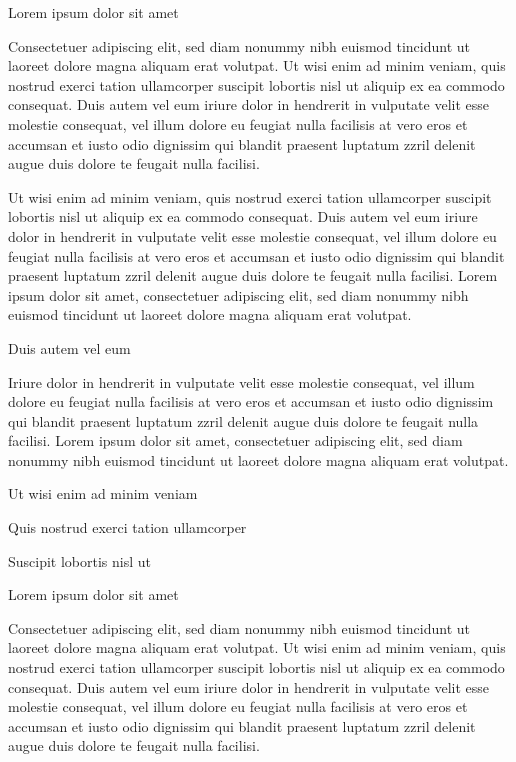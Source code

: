 \documentclass[11pt,twoside]{article}\makeatletter
\begin{document}
Lorem ipsum dolor sit amet\par
Consectetuer adipiscing elit, sed diam nonummy nibh euismod       tincidunt ut laoreet dolore magna aliquam erat volutpat. Ut wisi enim       ad minim veniam, quis nostrud exerci tation ullamcorper suscipit       lobortis nisl ut aliquip ex ea commodo consequat. Duis autem vel eum       iriure dolor in hendrerit in vulputate velit esse molestie consequat,       vel illum dolore eu feugiat nulla facilisis at vero eros et accumsan       et iusto odio dignissim qui blandit praesent luptatum zzril delenit       augue duis dolore te feugait nulla facilisi.\par
Ut wisi enim ad minim veniam, quis nostrud exerci tation       ullamcorper suscipit lobortis nisl ut aliquip ex ea commodo       consequat. Duis autem vel eum iriure dolor in hendrerit in vulputate       velit esse molestie consequat, vel illum dolore eu feugiat nulla       facilisis at vero eros et accumsan et iusto odio dignissim qui blandit       praesent luptatum zzril delenit augue duis dolore te feugait nulla       facilisi. Lorem ipsum dolor sit amet, consectetuer adipiscing elit,       sed diam nonummy nibh euismod tincidunt ut laoreet dolore magna       aliquam erat volutpat. \par
Duis autem vel eum \par
Iriure dolor in hendrerit in vulputate velit esse molestie       consequat, vel illum dolore eu feugiat nulla facilisis at vero eros et       accumsan et iusto odio dignissim qui blandit praesent luptatum zzril       delenit augue duis dolore te feugait nulla facilisi. Lorem ipsum dolor       sit amet, consectetuer adipiscing elit, sed diam nonummy nibh euismod       tincidunt ut laoreet dolore magna aliquam erat volutpat. \par
Ut wisi enim ad minim veniam\par
Quis nostrud exerci tation ullamcorper \par
Suscipit lobortis nisl ut \par
Lorem ipsum dolor sit amet\par
Consectetuer adipiscing elit, sed diam nonummy nibh euismod       tincidunt ut laoreet dolore magna aliquam erat volutpat. Ut wisi enim       ad minim veniam, quis nostrud exerci tation ullamcorper suscipit       lobortis nisl ut aliquip ex ea commodo consequat. Duis autem vel eum       iriure dolor in hendrerit in vulputate velit esse molestie consequat,       vel illum dolore eu feugiat nulla facilisis at vero eros et accumsan       et iusto odio dignissim qui blandit praesent luptatum zzril delenit       augue duis dolore te feugait nulla facilisi.\par
\end{document}
